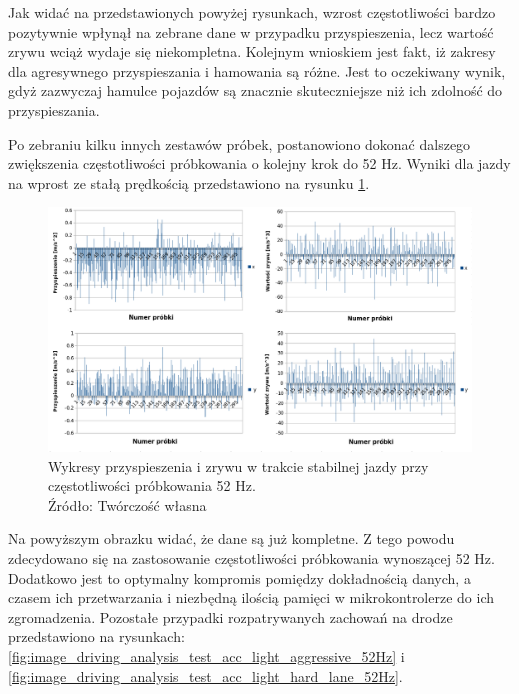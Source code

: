 \clearpage
Jak widać na przedstawionych powyżej rysunkach, wzrost częstotliwości bardzo pozytywnie wpłynął na zebrane dane w przypadku przyspieszenia, lecz wartość zrywu wciąż wydaje się niekompletna. Kolejnym wnioskiem jest fakt, iż zakresy dla agresywnego przyspieszania i hamowania są różne. Jest to oczekiwany wynik, gdyż zazwyczaj hamulce pojazdów są znacznie skuteczniejsze niż ich zdolność do przyspieszania. 

Po zebraniu kilku innych zestawów próbek, postanowiono dokonać dalszego zwiększenia częstotliwości próbkowania o kolejny krok do 52 Hz. Wyniki dla jazdy na wprost ze stałą prędkością przedstawiono na rysunku \ref{fig:image_driving_analysis_test_52Hz}.

\begin{figure}[H]
	\centering
	\includegraphics[width=15cm]{img/driving_analysis/stabilna_52.png}
	\caption{Wykresy przyspieszenia i zrywu w trakcie stabilnej jazdy przy częstotliwości próbkowania 52 Hz.
	\\Źródło: Twórczość własna}
	\label{fig:image_driving_analysis_test_52Hz}
\end{figure}

Na powyższym obrazku widać, że dane są już kompletne. Z tego powodu zdecydowano się na zastosowanie częstotliwości próbkowania wynoszącej 52 Hz. Dodatkowo jest to optymalny kompromis pomiędzy dokładnością danych, a czasem ich przetwarzania i niezbędną ilością pamięci w mikrokontrolerze do ich zgromadzenia. Pozostałe przypadki rozpatrywanych zachowań na drodze przedstawiono na rysunkach: \ref{fig:image_driving_analysis_test_acc_light_aggressive_52Hz} i \ref{fig:image_driving_analysis_test_acc_light_hard_lane_52Hz}.

